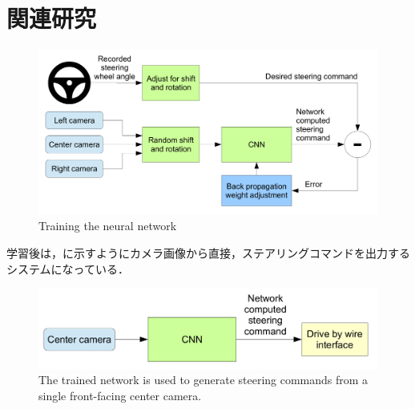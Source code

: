 
\section{関連研究}
     \begin{figure}[h]
          \centering
          \includegraphics[keepaspectratio, scale=0.16] {images/bojarski_train.png}
          \caption{Training the neural network \cite{bojarski}}
          \label{Fig:bojarski_train}
     \end{figure}

学習後は，に示すようにカメラ画像から直接，ステアリングコマンドを出力するシステムになっている．

     \begin{figure}[h]
          \centering
          \includegraphics[keepaspectratio, scale=0.20] {images/bojarski_test.png}
          \captionsetup{justification=raggedright} %
          \caption{The trained network is used to generate steering commands from a single front-facing center camera. \cite{bojarski}}
          \label{Fig:bojarski_test}
     \end{figure}

